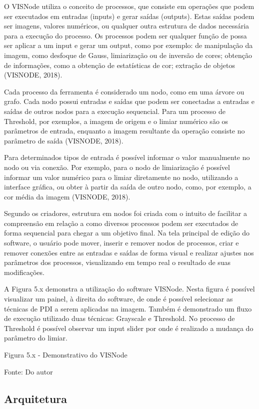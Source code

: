 \documentclass[
	12pt,				%
	oneside,			%
	a4paper,			%
	english,			%
	french,				%
	spanish,			%
	brazil,				%
	]{abntex2}
\begin{document}
O VISNode utiliza o conceito de processos, que consiste em operações que podem ser executados em entradas (inputs) e gerar saídas (outputs). Estas saídas podem ser imagens, valores numéricos, ou qualquer outra estrutura de dados necessária para a execução do processo. Os processos podem ser qualquer função de possa ser aplicar a um input e gerar um output, como por exemplo: de manipulação da imagem, como desfoque de Gauss, limiarização ou de inversão de cores; obtenção de informações, como a obtenção de estatísticas de cor;  extração de objetos (VISNODE, 2018).

Cada processo da ferramenta é considerado um nodo, como em uma árvore ou grafo. Cada nodo possui entradas e saídas que podem ser conectadas a entradas e saídas de outros nodos para a execução sequencial. Para um processo de Threshold, por exemplos, a imagem de origem e o limiar numérico são os parâmetros de entrada, enquanto a imagem resultante da operação consiste no parâmetro de saída (VISNODE, 2018). 

Para determinados tipos de entrada é possível informar o valor manualmente no nodo ou via conexão. Por exemplo, para o nodo de limiarização é possível informar um valor numérico para o limiar diretamente no nodo, utilizando a interface gráfica, ou obter à partir da saída de outro nodo, como, por exemplo, a cor média da imagem (VISNODE, 2018).

Segundo os criadores, estrutura em nodos foi criada com o intuito de facilitar a compreensão em relação a como diversos processos podem ser executados de forma sequencial para chegar a um objetivo final. Na tela principal de edição do software, o usuário pode mover, inserir e remover nodos de processos, criar e remover conexões entre as entradas e saídas de forma visual e realizar ajustes nos parâmetros dos processos, visualizando em tempo real o resultado de suas modificações.

A Figura 5.x demonstra a utilização do software VISNode. Nesta figura é possível visualizar um painel, à direita do software, de onde é possível selecionar as técnicas de PDI a serem aplicadas na imagem. Também é demonstrado um fluxo de execução utilizado duas técnicas: Grayscale e Threshold. No processo de Threshold é possível observar um input slider por onde é realizado a mudança do parâmetro do limiar.

Figura 5.x - Demonstrativo do VISNode

Fonte: Do autor

\subsection{Arquitetura}
\end{document}
